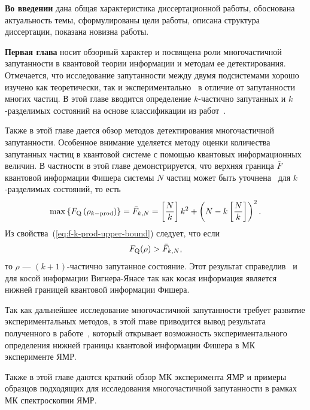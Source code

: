 \textbf{Во введении} дана общая характеристика диссертационной работы,
обоснована актуальность темы,
сформулированы цели работы,
описана структура диссертации,
показана новизна работы.

\textbf{Первая глава} носит обзорный характер и посвящена роли многочастичной запутанности в квантовой теории информации и методам ее детектирования.
Отмечается, что исследование запутанности между двумя подсистемами хорошо изучено как теоретически, так и экспериментально~\cite{Aldoshin2012} в отличие от запутанности многих частиц.
В этой главе вводится определение $k$-частично запутанных и $k$-разделимых состояний на основе классификации из работ~\cite{Seevinck2001,Chen2005, Guhne2005}.



Также в этой главе дается обзор методов детектирования многочастичной запутанности.
Особенное внимание уделяется методу оценки количества запутанных частиц в квантовой системе с помощью квантовых информационных величин.
В частности в этой главе демонстрируется,
что верхняя граница $\bar F$ квантовой информации Фишера системы $N$ частиц может быть уточнена~\cite{Hyllus2012} для $k$-разделимых состояний, то есть
%
\begin{equation}\label{eq:f-k-prod-upper-bound}
  \max\left\{F_\mathrm{Q}\left( \rho_{k-\mathrm{prod}} \right) \right\}
  = \bar F_{k, N}
  = \left[ \frac N k \right] k^2 + \left( N - k \left[ \frac N k \right] \right)^2.
\end{equation}
%
Из свойства~(\ref{eq:f-k-prod-upper-bound}) следует,
что если
%
\begin{equation}\label{eq:qfi-entanglement-criteria}
  F_\mathrm{Q}(\rho) > \bar F_{k, N},
\end{equation}
то $\rho$ --- $(k+1)$-частично запутанное состояние.
Этот результат справедлив~\cite{Chen2005} и для косой информации Вигнера-Янасе
так как косая информация является~\cite{Luo2003pamc} нижней границей квантовой информации Фишера.

Так как дальнейшее исследование многочастичной запутанности требует развитие экспериментальных методов,
в этой главе приводится вывод результата полученного в работе~\cite{Garttner2018},
который открывает возможность экспериментального определения нижней границы квантовой информации Фишера в МК эксперименте ЯМР.

Также в этой главе даются краткий обзор МК эксперимента ЯМР
и примеры образцов подходящих для исследования многочастичной запутанности в рамках МК спектроскопии ЯМР.


